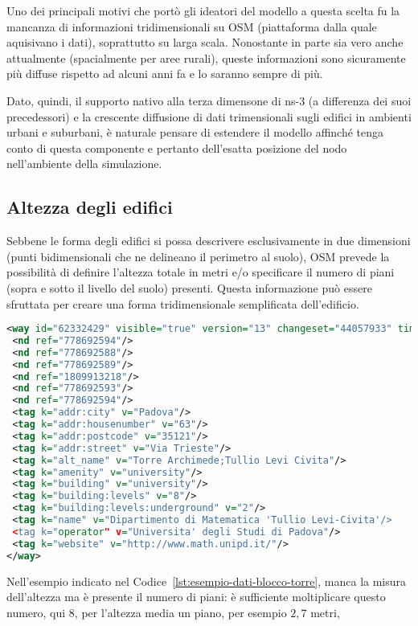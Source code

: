Uno dei principali motivi che portò gli ideatori del modello a questa scelta fu la mancanza di informazioni tridimensionali
su OSM (piattaforma dalla quale aquisivano i dati), soprattutto su larga scala.
Nonostante in parte sia vero anche attualmente (spacialmente per aree rurali), queste informazioni sono sicuramente
più diffuse rispetto ad alcuni anni fa e lo saranno sempre di più.

Dato, quindi, il supporto nativo alla terza dimensone di ns-3 (a differenza dei suoi precedessori) e la crescente diffusione
di dati trimensionali sugli edifici in ambienti urbani e suburbani, è naturale pensare di estendere il modello affinché
tenga conto di questa componente e pertanto dell'esatta posizione del nodo nell'ambiente della simulazione.
%
\subsection{Altezza degli edifici}\label{subsec:altezza-edifici}
Sebbene le forma degli edifici si possa descrivere esclusivamente in due dimensioni (punti bidimensionali che ne delineano il perimetro al suolo),
OSM prevede la possibilità di definire l'altezza totale in metri e/o specificare il numero di piani (sopra e sotto il livello del suolo)
presenti.
Questa informazione può essere sfruttata per creare una forma tridimensionale semplificata dell'edificio.
%
\begin{lstlisting}[language=XML,style=mystyle,numbers=none,label={lst:esempio-dati-blocco-torre},caption={Esempio di informazioni di un edificio estratte da OSM.}]
<way id="62332429" visible="true" version="13" changeset="44057933" timestamp="2016-11-30T11:53:34Z" user="Agno-phi" uid="731498" >
 <nd ref="778692594"/>
 <nd ref="778692588"/>
 <nd ref="778692589"/>
 <nd ref="1809913218"/>
 <nd ref="778692593"/>
 <nd ref="778692594"/>
 <tag k="addr:city" v="Padova"/>
 <tag k="addr:housenumber" v="63"/>
 <tag k="addr:postcode" v="35121"/>
 <tag k="addr:street" v="Via Trieste"/>
 <tag k="alt_name" v="Torre Archimede;Tullio Levi Civita"/>
 <tag k="amenity" v="university"/>
 <tag k="building" v="university"/>
 <tag k="building:levels" v="8"/>
 <tag k="building:levels:underground" v="2"/>
 <tag k="name" v="Dipartimento di Matematica 'Tullio Levi-Civita'/>
 <tag k="operator" v="Universita' degli Studi di Padova"/>
 <tag k="website" v="http://www.math.unipd.it/"/>
</way>
\end{lstlisting}
%
Nell'esempio indicato nel Codice~\ref{lst:esempio-dati-blocco-torre}, manca la misura dell'altezza ma è presente
il numero di piani: è sufficiente moltiplicare questo numero, qui $8$, per l'altezza media un piano, per esempio $2,7$ metri,
